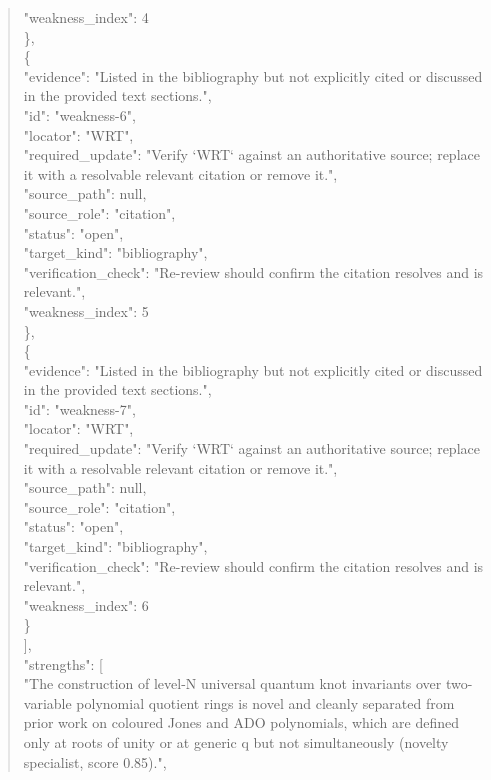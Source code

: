 \documentclass[11pt]{article}
\begin{document}
\begin{quote}
      "weakness\_index": 4\\
    \},\\
    \{\\
      "evidence": "Listed in the bibliography but not explicitly cited or discussed in the provided text sections.",\\
      "id": "weakness-6",\\
      "locator": "WRT",\\
      "required\_update": "Verify `WRT` against an authoritative source; replace it with a resolvable relevant citation or remove it.",\\
      "source\_path": null,\\
      "source\_role": "citation",\\
      "status": "open",\\
      "target\_kind": "bibliography",\\
      "verification\_check": "Re-review should confirm the citation resolves and is relevant.",\\
      "weakness\_index": 5\\
    \},\\
    \{\\
      "evidence": "Listed in the bibliography but not explicitly cited or discussed in the provided text sections.",\\
      "id": "weakness-7",\\
      "locator": "WRT",\\
      "required\_update": "Verify `WRT` against an authoritative source; replace it with a resolvable relevant citation or remove it.",\\
      "source\_path": null,\\
      "source\_role": "citation",\\
      "status": "open",\\
      "target\_kind": "bibliography",\\
      "verification\_check": "Re-review should confirm the citation resolves and is relevant.",\\
      "weakness\_index": 6\\
    \}\\
  ],\\
  "strengths": [\\
    "The construction of level-N universal quantum knot invariants over two-variable polynomial quotient rings is novel and cleanly separated from prior work on coloured Jones and ADO polynomials, which are defined only at roots of unity or at generic q but not simultaneously (novelty specialist, score 0.85).",\\

\end{quote}
\end{document}
